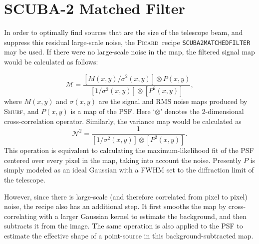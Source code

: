\documentclass[twoside,11pt]{article}
\newcommand{\xref}[3]{#1}
\newcommand{\xlabel}[1]{}
\renewcommand{\_}{\texttt{\symbol{95}}}
\newcommand{\picard}{\xref{\textsc{Picard}}{sun265}{}}
\newcommand{\smurf}{\xref{\textsc{Smurf}}{sun258}{}}
\newcommand{\drrecipe}[1]{\texttt{#1}}
\begin{document}
\section{\xlabel{matchedfilter}SCUBA-2 Matched Filter}
\label{app:mf}

In order to optimally find sources that are the size of the telescope
beam, and suppress this residual large-scale noise, the \picard\
recipe \drrecipe{SCUBA2\_MATCHED\_FILTER} may be used. If there were
no large-scale noise in the map, the filtered signal map would be
calculated as follows:

\begin{equation}
\mathcal{M} = \frac{[M(x,y)/\sigma^2(x,y)] \otimes P(x,y)}
  {[1/\sigma^2(x,y)] \otimes [P^2(x,y)]},
\end{equation}
%
where $M(x,y)$ and $\sigma(x,y)$ are the signal and RMS
noise maps produced by \smurf, and $P(x,y)$ is a map of the
PSF. Here `$\otimes$' denotes the 2-dimensional cross-correlation
operator. Similarly, the variance map would be calculated as
%
\begin{equation}
  \mathcal{N}^2 = \frac{1}{[1/\sigma^2(x,y)] \otimes [P^2(x,y)]}.
\end{equation}
%
This operation is equivalent to calculating the maximum-likelihood fit
of the PSF centered over every pixel in the map, taking into account
the noise. Presently $P$ is simply modeled as an ideal Gaussian
with a FWHM set to the diffraction limit of the telescope.

However, since there is large-scale (and therefore correlated from
pixel to pixel) noise, the recipe also has an additional step. It
first smooths the map by cross-correlating with a larger Gaussian
kernel to estimate the background, and then subtracts it from the
image. The same operation is also applied to the PSF to estimate the
effective shape of a point-source in this background-subtracted map.
\end{document}
